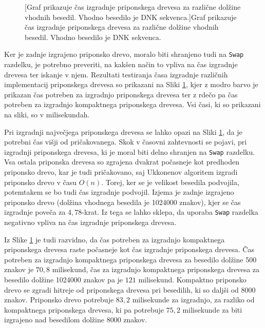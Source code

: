 \begin{figure}[htb]
    \centering
    
    [Graf prikazuje čas izgradnje priponskega drevesa za različne dolžine vhodnih besedil. Vhodno besedilo je DNK sekvenca.]{Graf prikazuje čas izgradnje priponskega drevesa za različne dolžine vhodnih besedil. Vhodno besedilo je DNK sekvenca.} 
    \label{fig:IzgradnjaGraf}
\end{figure}

Ker je zadnje izgrajeno priponsko drevo, moralo biti shranjeno tudi na \verb|Swap| razdelku, je potrebno preveriti, na kakšen način to vpliva na čas izgradnje drevesa ter iskanje v njem. Rezultati testiranja časa izgradnje različnih implementacij priponskega drevesa so prikazani na Sliki \ref{fig:IzgradnjaGraf}, kjer z modro barvo je prikazan čas potreben za izgradnjo priponskega drevesa ter z rdečo pa čas potreben za izgradnjo kompaktnega priponskega drevesa. Vsi časi, ki so prikazani na sliki, so v milisekundah.

\newpage
Pri izgradnji največjega priponskega drevesa se lahko opazi na Sliki \ref{fig:IzgradnjaGraf}, da je potrebni čas višji od pričakovanega. Skok v časovni zahtevnosti se pojavi, pri izgradnji priponskega drevesa, ki je moral biti delno shranjen na \verb|Swap| razdelku. Vsa ostala priponska drevesa so zgrajena dvakrat počasneje kot predhoden priponsko drevo, kar je tudi pričakovano, saj Ukkonenov algoritem izgradi priponsko drevo v času $O(n)$. Torej, ker se je velikost besedila podvojila, potemtakem se bo tudi čas izgradnje podvojil. Izjema je zadnje izgrajeno priponsko drevo (dolžina vhodnega besedila je 1024000 znakov), kjer se čas izgradnje poveča za $4,78$-krat. Iz tega se lahko sklepa, da uporaba \verb|Swap| razdelka negativno vpliva na čas izgradnje priponskega drevesa.

Iz Slike \ref{fig:IzgradnjaGraf} je tudi razvidno, da čas potreben za izgradnjo kompaktnega priponskega drevesa raste počasneje kot čas izgradnje priponskega drevesa. Čas potreben za izgradnjo kompaktnega priponskega drevesa za besedilo dolžine 500 znakov je $70,8$ milisekund, čas za izgradnjo kompaktnega priponskega drevesa za besedilo dolžine 1024000 znakov pa je $121$ milisekund. Kompaktno priponsko drevo se zgradi hitreje od priponskega drevesa pri besedilih, ki so daljši od 8000 znakov. Priponsko drevo potrebuje $83,2$ milisekunde za izgradnjo, za razliko od kompaktnega priponskega drevesa, ki pa potrebuje $75,2$ milisekunde za biti izgrajeno nad besedilom dolžine 8000 znakov.

